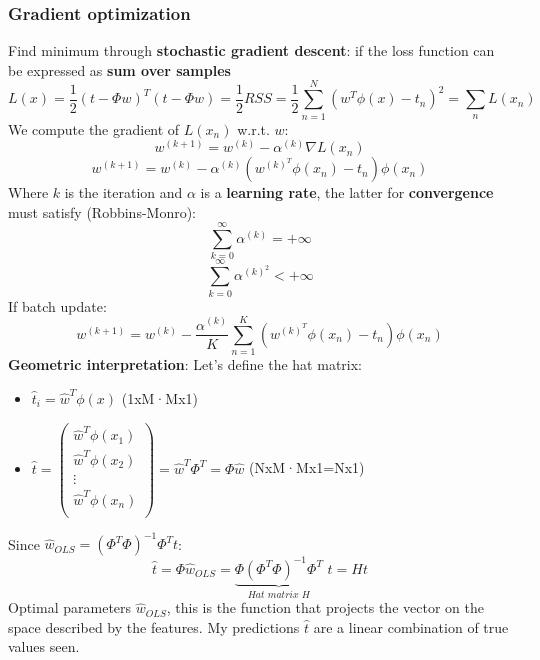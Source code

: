 \subsubsection{Gradient optimization}
    Find minimum through \textbf{stochastic gradient descent}: if the loss function can be expressed as \textbf{sum over samples}
    $$L(x)=\frac{1}{2}(t-\Phi w)^T(t-\Phi w)=\frac{1}{2}RSS=\frac{1}{2}\sum_{n=1}^N(w^T\phi(x)-t_n)^2=\sum_nL(x_n)$$
    We compute the gradient of $L(x_n)$ w.r.t. $w$:
    $$w^{(k+1)}=w^{(k)}-\alpha^{(k)}\nabla L(x_n)$$
    $$w^{(k+1)}=w^{(k)}-\alpha^{(k)}\left(w^{(k)^T}\phi(x_n)-t_n\right)\phi(x_n)$$
    Where $k$ is the iteration and $\alpha$ is a \textbf{learning rate}, the latter for \textbf{convergence} must satisfy (Robbins-Monro):
    $$\sum_{k=0}^\infty \alpha^{(k)}=+\infty$$
    $$\sum_{k=0}^\infty \alpha^{(k)^2}<+\infty$$
    If batch update:
    $$w^{(k+1)}=w^{(k)}-\frac{\alpha^{(k)}}{K}\sum_{n=1}^K(w^{(k)^T}\phi(x_n)-t_n)\phi(x_n)$$
    \textbf{Geometric interpretation}:
    Let's define the hat matrix:
    \begin{itemize}
        \item $\hat{t}_i=\hat{w}^T\phi(x)$ (1xM·Mx1)
        \item 
        $
            \hat{t}=
            \begin{pmatrix}
                \hat{w}^T\phi(x_1)\\
                \hat{w}^T\phi(x_2)\\
                \vdots\\
                \hat{w}^T\phi(x_n)\\
            \end{pmatrix}
            =\hat{w}^T\Phi^T=\Phi\hat{w}
        $ (NxM·Mx1=Nx1)
    \end{itemize}
    Since $\hat{w}_{OLS}=(\Phi^T\Phi)^{-1}\Phi^Tt$:
    $$\hat{t}=\Phi\hat{w}_{OLS}=\underset{Hat\,\,matrix\,\,H}{\underbrace{\Phi(\Phi^T\Phi)^{-1}\Phi^T}}\,\,t=Ht$$
    Optimal parameters  $\hat{w}_{OLS}$, this is the function that projects the vector on the space described by the features. My predictions $\hat{t}$ are a linear combination of true values seen.
